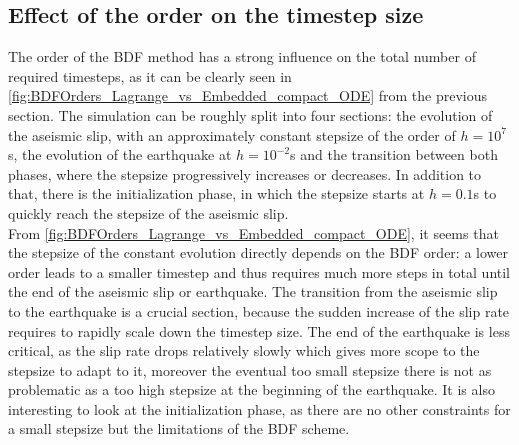 \subsection{Effect of the order on the timestep size}
The order of the BDF method has a strong influence on the total number of required timesteps, as it can be clearly seen in \autoref{fig:BDFOrders_Lagrange_vs_Embedded_compact_ODE} from the previous section. The simulation can be roughly split into four sections: the evolution of the aseismic slip, with an approximately constant stepsize of the order of $h=10^7$s, the evolution of the earthquake at $h=10^{-2}$s and the transition between both phases, where the stepsize progressively increases or decreases. In addition to that, there is the initialization phase, in which the stepsize starts at $h=0.1$s to quickly reach the stepsize of the aseismic slip. \\
From \autoref{fig:BDFOrders_Lagrange_vs_Embedded_compact_ODE}, it seems that the stepsize of the constant evolution directly depends on the BDF order: a lower order leads to a smaller timestep and thus requires much more steps in total until the end of the aseismic slip or earthquake. The transition from the aseismic slip to the earthquake is a crucial section, because the sudden increase of the slip rate requires to rapidly scale down the timestep size. The end of the earthquake is less critical, as the slip rate drops relatively slowly which gives more scope to the stepsize to adapt to it, moreover the eventual too small stepsize there is not as problematic as a too high stepsize at the beginning of the earthquake. It is also interesting to look at the initialization phase, as there are no other constraints for a small stepsize but the limitations of the BDF scheme. \\
